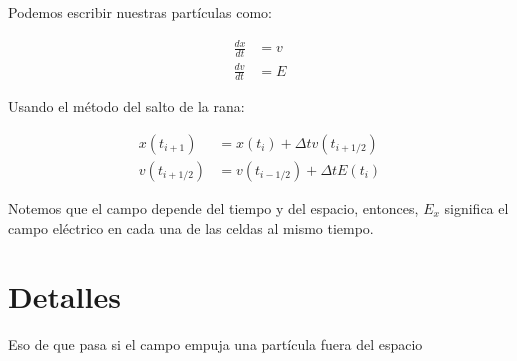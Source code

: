 \documentclass[11pt]{article}
\begin{document}
Podemos escribir nuestras partículas como:

\begin{align*}
    \frac{dx}{dt} &= v \\
    \frac{dv}{dt} &= E
\end{align*}

Usando el método del salto de la rana:

\begin{align*}
    x(t_{i+1}) &= x(t_i) + \Delta t v(t_{i+1/2})\\
    v(t_{i+1/2}) &= v(t_{i-1/2}) + \Delta t E(t_i)
\end{align*}

Notemos que el campo depende del tiempo y del espacio, entonces, $E_x$ significa el campo eléctrico en cada una de las celdas al mismo tiempo.

\section{Detalles}

Eso de que pasa si el campo empuja una partícula fuera del espacio
\end{document}
